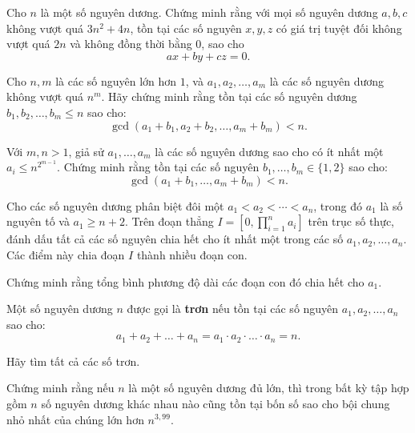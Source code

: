 \documentclass[./m.tex]{subfiles}
\begin{document}
\begin{problem}\label{problem:CHN-2015-TST1-D2-P2}
	Cho \( n \) là một số nguyên dương. Chứng minh rằng với mọi số nguyên dương \( a, b, c \) không vượt quá \( 3n^2 + 4n \),
	tồn tại các số nguyên \( x, y, z \) có giá trị tuyệt đối không vượt quá \( 2n \) và không đồng thời bằng 0, sao cho
	\[
		ax + by + cz = 0.
	\]
\end{problem}

\begin{problem}\label{problem:EGMO-2015-P3}
	Cho \( n, m \) là các số nguyên lớn hơn \( 1 \), và \( a_1, a_2, \dots, a_m \) là các số nguyên dương không vượt quá \( n^m \).
	Hãy chứng minh rằng tồn tại các số nguyên dương \( b_1, b_2, \dots, b_m \leq n \) sao cho:
	\[
		\gcd(a_1 + b_1, a_2 + b_2, \dots, a_m + b_m) < n.
	\]
\end{problem}

\begin{problem}\label{problem:EGMO-2015-P3-strong}
	Với \( m, n > 1 \), giả sử \( a_1, \dots, a_m \) là các số nguyên dương sao cho có ít nhất một \( a_i \leq n^{2^{m-1}} \). 
	Chứng minh rằng tồn tại các số nguyên \( b_1, \dots, b_m \in \{1, 2\} \) sao cho:
	\[
		\gcd(a_1 + b_1, \dots, a_m + b_m) < n.
	\]
\end{problem}

\begin{problem}\label{problem:GBR-2015-TST-N3-P3}
    Cho các số nguyên dương phân biệt đôi một \( a_1 < a_2 < \cdots < a_n \), trong đó \( a_1 \) là số nguyên tố và \( a_1 \geq n + 2 \).
    Trên đoạn thẳng \( I = \left[0, \prod_{i=1}^n a_i \right] \) trên trục số thực,
    đánh dấu tất cả các số nguyên chia hết cho ít nhất một trong các số \( a_1, a_2, \ldots, a_n \).
    Các điểm này chia đoạn \( I \) thành nhiều đoạn con.

    Chứng minh rằng tổng bình phương độ dài các đoạn con đó chia hết cho \( a_1 \).
\end{problem}

\begin{problem}\label{problem:GER-2015-MO-P2}
    Một số nguyên dương \( n \) được gọi là \textbf{trơn} nếu tồn tại các số nguyên \( a_1, a_2, \dots, a_n \) sao cho:
    \[
        a_1 + a_2 + \dots + a_n = a_1 \cdot a_2 \cdot \dots \cdot a_n = n.
    \]
    
    Hãy tìm tất cả các số trơn.
\end{problem}

\begin{problem}\label{problem:HUN-2015-TST-KMA-633}
    Chứng minh rằng nếu \( n \) là một số nguyên dương đủ lớn,
    thì trong bất kỳ tập hợp gồm \( n \) số nguyên dương khác nhau nào cũng tồn tại bốn số sao cho bội chung nhỏ nhất của chúng lớn hơn \( n^{3{,}99} \).
\end{problem}
\end{document}
